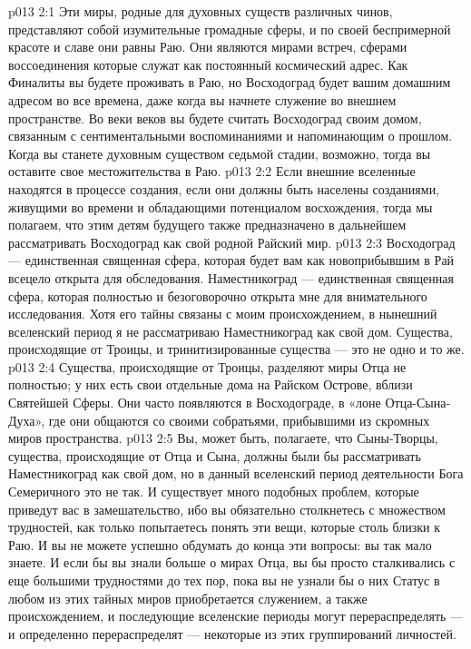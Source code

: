 \vs p013 2:1 Эти миры, родные для духовных существ различных чинов, представляют собой изумительные громадные сферы, и по своей беспримерной красоте и славе они равны Раю. Они являются мирами встреч, сферами воссоединения которые служат как постоянный космический адрес. Как Финалиты вы будете проживать в Раю, но Восходоград будет вашим домашним адресом во все времена, даже когда вы начнете служение во внешнем пространстве. Во веки веков вы будете считать Восходоград своим домом, связанным с сентиментальными воспоминаниями и напоминающим о прошлом. Когда вы станете духовным существом седьмой стадии, возможно, тогда вы оставите свое местожительства в Раю.
\vs p013 2:2 Если внешние вселенные находятся в процессе создания, если они должны быть населены созданиями, живущими во времени и обладающими потенциалом восхождения, тогда мы полагаем, что этим детям будущего также предназначено в дальнейшем рассматривать Восходоград как свой родной Райский мир.
\vs p013 2:3 \pc Восходоград --- единственная священная сфера, которая будет вам как новоприбывшим в Рай всецело открыта для обследования. Наместникоград --- единственная священная сфера, которая полностью и безоговорочно открыта мне для внимательного исследования. Хотя его тайны связаны с моим происхождением, в нынешний вселенский период я не рассматриваю Наместникоград как свой дом. Существа, происходящие от Троицы, и тринитизированные существа --- это не одно и то же.
\vs p013 2:4 \pc Существа, происходящие от Троицы, разделяют миры Отца не полностью; у них есть свои отдельные дома на Райском Острове, вблизи Святейшей Сферы. Они часто появляются в Восходограде, в «лоне Отца\hyp{}Сына\hyp{}Духа», где они общаются со своими собратьями, прибывшими из скромных миров пространства.
\vs p013 2:5 \pc Вы, может быть, полагаете, что Сыны\hyp{}Творцы, существа, происходящие от Отца и Сына, должны были бы рассматривать Наместникоград как свой дом, но в данный вселенский период деятельности Бога Семеричного это не так. И существует много подобных проблем, которые приведут вас в замешательство, ибо вы обязательно столкнетесь с множеством трудностей, как только попытаетесь понять эти вещи, которые столь близки к Раю. И вы не можете успешно обдумать до конца эти вопросы: вы так мало знаете. И если бы вы знали больше о мирах Отца, вы бы просто сталкивались с еще большими трудностями до тех пор, пока вы не узнали бы о них  Статус в любом из этих тайных миров приобретается служением, а также происхождением, и последующие вселенские периоды могут перераспределять --- и определенно перераспределят --- некоторые из этих группирований личностей.
